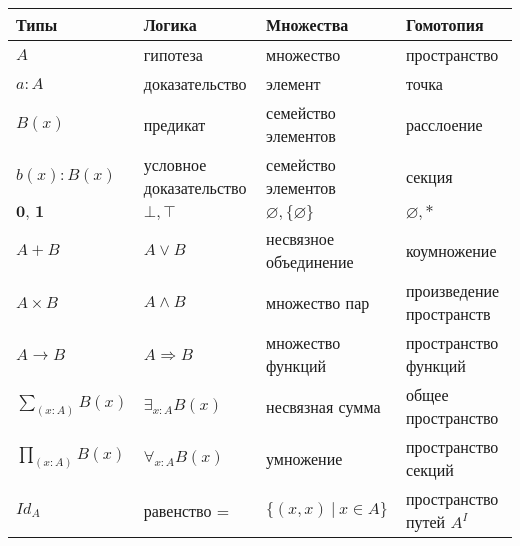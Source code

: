 \documentclass{article}
\begin{document}
  \bgroup
  \def\arraystretch{1.5}%
    \begin{tabular}{ l l l l }
      \hline
      \textbf{Типы} & \textbf{Логика} & \textbf{Множества} & \textbf{Гомотопия} \\
      \hline
      \(A\) & гипотеза & множество & пространство \\
      \(a : A\) & доказательство & элемент & точка \\
      \(B(x)\) & предикат & семейство элементов & расслоение \\
      \(b(x) : B(x)\) & условное доказательство & семейство элементов & секция \\
      \(\textbf{0, 1}\) & \(\bot, \top\) & \(\varnothing, \{\varnothing\}\) & \(\varnothing, *\) \\
      \(A + B\) & \(A \vee B\) & несвязное объединение & коумножение \\
      \(A \times B\) & \(A \wedge B\) & множество пар & произведение пространств \\
      \(A \to B\) & \(A \Rightarrow B\) & множество функций & пространство функций \\
      \(\sum_{(x:A)} B(x)\) & \(\exists_{x:A} B(x)\) & несвязная сумма & общее пространство \\
      \(\prod_{(x:A)} B(x)\) & \(\forall_{x:A} B(x)\) & умножение & пространство секций \\
      \(Id_A\) & равенство = & \(\{ (x,x) \ | \ x \in A \}\) & пространство путей \(A^I\) \\
    \end{tabular}
  \egroup
\end{document}
